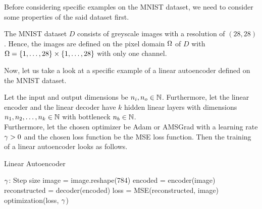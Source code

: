 Before considering specific examples on the MNIST dataset, we need to consider some properties of the said dataset first.

\begin{remark}\label{remark:mnist}
The MNIST dataset $D$ consists of greyscale images with a resolution of $(28,28)$. Hence, the images are defined on the pixel domain $\Omega$ of $D$ with $\Omega=\{1,\ldots,28\}\times\{1,\ldots,28\}$ with only one channel.
\end{remark}

Now, let us take a look at a specific example of a linear autoencoder defined on the MNIST dataset.

\begin{algorithm}
Let the input and output dimensions be $n_i, n_o \in\operatorname{\mathbb{N}}$. Furthermore, let the linear encoder and the linear decoder have $k$ hidden linear layers with dimensions $n_1, n_2,\ldots, n_k\in\operatorname{\mathbb{N}}$ with bottleneck $n_b\in\operatorname{\mathbb{N}}$.\\
Furthermore, let the chosen optimizer be Adam or AMSGrad with a learning rate $\operatorname{\gamma}>0$ and the chosen loss function be the MSE loss function. Then the training of a linear autoencoder looks as follows.
\caption{Linear Autoencoder}\label{alg:linear_AE}
\begin{algorithmic}[1]
\Require $\operatorname{\gamma}$: Step size
		\State image = image.reshape(784) 
	    \State encoded = encoder(image) 
		\State reconstructed = decoder(encoded) 
    	\State loss = MSE(reconstructed, image) 
	    \State optimization(loss, $\operatorname{\gamma}$) 
    \EndFor
\EndFor
\end{algorithmic}
\end{algorithm}


